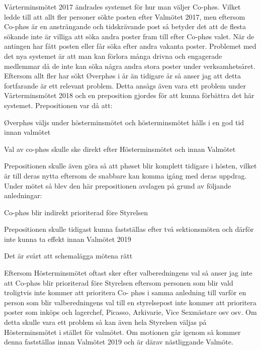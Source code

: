 \documentclass[../_main/handlingar.tex]{subfiles}
\begin{document}
Vårterminsmötet 2017 ändrades systemet för hur man väljer Co-phøs. Vilket ledde till att allt fler
personer sökte posten efter Valmötet 2017, men eftersom Co-phøs är en ansträngande och
tidskrävande post så betyder det att de flesta sökande inte är villiga att söka andra poster fram till
efter Co-phøs valet. När de antingen har fått posten eller får söka efter andra vakanta poster.
Problemet med det nya systemet är att man kan förlora många drivna och engagerade medlemmar
då de inte kan söka några andra stora poster under verksamhetsåret. Eftersom allt fler har sökt
Øverphøs i år än tidigare år så anser jag att detta fortfarande är ett relevant problem. Detta ansågs
även vara ett problem under Vårterminsmötet 2018 och en preposition gjordes för att kunna
förbättra det här systemet. Prepositionen var då att:

\begin{dashlist}
\item Øverphøs väljs under hösterminsmötet och hösterminsmötet hålls i en god tid innan
valmötet
\item Val av co-phøs skulle ske direkt efter Hösterminsmötet och innan Valmötet
\end{dashlist}

Prepositionen skulle även göra så att phøset blir komplett tidigare i hösten, vilket är till deras nytta
eftersom de snabbare kan komma igång med deras uppdrag. Under mötet så blev den här
prepositionen avslagen på grund av följande anledningar:

\begin{dashlist}
  \item Co-phøs blir indirekt prioriterad före Styrelsen
  \item Prepositionen skulle tidigast kunna fastställas efter två sektionsmöten och därför inte kunna
  ta effekt innan Valmötet 2019
  \item Det är svårt att schemalägga mötena rätt
\end{dashlist}

Eftersom Hösterminsmötet oftast sker efter valberedningens val så anser jag inte att Co-phøs blir
prioriterad före Styrelsen eftersom personen som blir vald troligtvis inte kommer att prioritera Co-
phøs i samma anledning till varför en person som blir valberedningens val till en styrelsepost inte
kommer att prioritera poster som inköps och lagerchef, Picasso, Arkivarie, Vice Sexmästare osv osv.
Om detta skulle vara ett problem så kan även hela Styrelsen väljas på Hösterminsmötet i stället för
valmötet. Om motionen går igenom så kommer denna fastställas innan Valmötet 2019 och är därav
nästliggande Valmöte.
\end{document}
